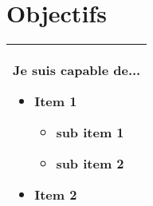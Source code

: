\section*{Objectifs}
 { \small
  \begin{spacing}{1.2}
	  \begin{tabularx}{\textwidth}{|X|}
		  \hline
		  \textbf{Je suis capable de...}
		  \begin{itemize}
			  \item Item 1
			        \begin{itemize}[label={}]
				        \item sub item 1
				        \item sub item 2
			        \end{itemize}
			  \item Item 2
		  \end{itemize} \\
		  \hline
	  \end{tabularx}
  \end{spacing}
 }

